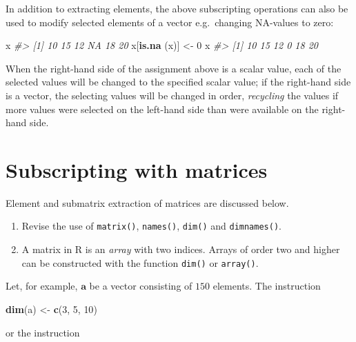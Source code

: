 \documentclass[
]{book}
\newenvironment{Shaded}{\begin{snugshade}}{\end{snugshade}}
\newcommand{\CommentTok}[1]{\textcolor[rgb]{0.56,0.35,0.01}{\textit{#1}}}
\newcommand{\DecValTok}[1]{\textcolor[rgb]{0.00,0.00,0.81}{#1}}
\newcommand{\FunctionTok}[1]{\textcolor[rgb]{0.13,0.29,0.53}{\textbf{#1}}}
\newcommand{\NormalTok}[1]{#1}
\newcommand{\OtherTok}[1]{\textcolor[rgb]{0.56,0.35,0.01}{#1}}
\begin{document}
In addition to extracting elements, the above subscripting operations can also be used to modify selected elements of a vector e.g.~changing NA-values to zero:

\begin{Shaded}
\begin{Highlighting}[]
\NormalTok{x}
\CommentTok{\#\textgreater{} [1] 10 15 12 NA 18 20}
\NormalTok{x[}\FunctionTok{is.na}\NormalTok{ (x)] }\OtherTok{\textless{}{-}} \DecValTok{0}
\NormalTok{x}
\CommentTok{\#\textgreater{} [1] 10 15 12  0 18 20}
\end{Highlighting}
\end{Shaded}

When the right-hand side of the assignment above is a scalar value, each of the selected values will be changed to the specified scalar value; if the right-hand side is a vector, the selecting values will be changed in order, \emph{{recycling}} the values if more values were selected on the left-hand side than were available on the right-hand side.

\section{Subscripting with matrices}\label{subscripting-with-matrices}

Element and submatrix extraction of matrices are discussed below.

\begin{enumerate}
\def\labelenumi{(\alph{enumi})}
\item
  Revise the use of \texttt{matrix()}, \texttt{names()}, \texttt{dim()} and \texttt{dimnames()}.
\item
  A matrix in R is an \emph{{array}} with two indices. Arrays of order two and higher can be constructed with the function \texttt{dim()} or \texttt{array()}.
\end{enumerate}

Let, for example, \(\mathbf{a}\) be a vector consisting of \(150\) elements. The instruction

\begin{Shaded}
\begin{Highlighting}[]
\FunctionTok{dim}\NormalTok{(a) }\OtherTok{\textless{}{-}} \FunctionTok{c}\NormalTok{(}\DecValTok{3}\NormalTok{, }\DecValTok{5}\NormalTok{, }\DecValTok{10}\NormalTok{) }
\end{Highlighting}
\end{Shaded}

or the instruction
\end{document}
